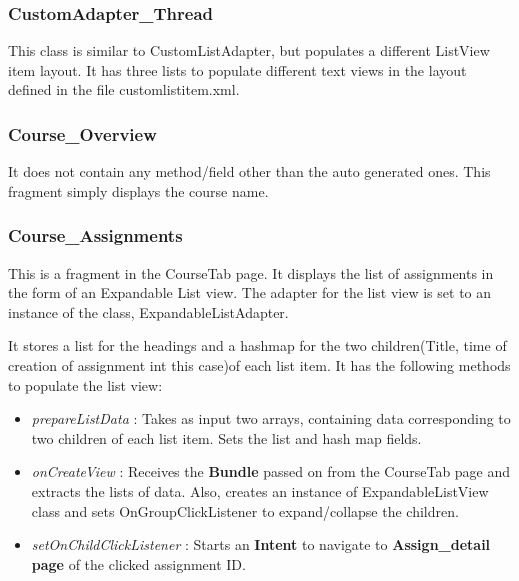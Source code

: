 \documentclass{article}
\begin{document}
\subsubsection{CustomAdapter\_Thread}
\par\noindent This class is similar to CustomListAdapter, but populates a different ListView item layout. It has three lists to populate different text views in the layout defined in the file customlistitem.xml.

\subsubsection{Course\_Overview}
\par\noindent It does not contain any method/field other than the auto generated ones. This fragment simply displays the course name.

\subsubsection{Course\_Assignments}
\par\noindent This is a fragment in the CourseTab page. It displays the list of assignments in the form of an Expandable List view. The adapter for the list view is set to an instance of the class, ExpandableListAdapter. 
\par\noindent It stores a list for the headings and a hashmap for the two children(Title, time of creation of assignment int this case)of each list item.
It has the following methods to populate the list view:
\begin{itemize}
\item \textit{prepareListData} : Takes as input two arrays, containing data corresponding to two children of each list item. Sets the list and hash map fields.
\item \textit{onCreateView} : Receives the \textbf{Bundle} passed on from the CourseTab page and extracts the lists of data. Also, creates an instance of ExpandableListView class and sets OnGroupClickListener to expand/collapse the children.
\item \textit{setOnChildClickListener} : Starts an \textbf{Intent} to navigate to \textbf{Assign\_detail page} of the clicked assignment ID.
\end{itemize}
\end{document}
